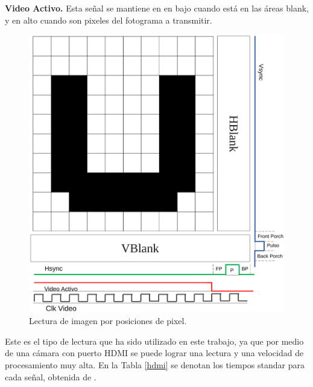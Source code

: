 \documentclass[twoside,spanish,ESP,MSc]{plantillaLabUPV}
\theoremstyle{definition}
\begin{document}
\begin{enumerate}
 \checkmark\textbf{Video Activo.} Esta señal se mantiene en en bajo cuando está en las áreas blank, y en alto cuando son pixeles del fotograma a transmitir.
 
 
 \begin{figure}[!tbh]
 	\centering
 	\includegraphics[scale=0.3]{edrawimas/scanU}
 	\caption{Lectura de imagen por posiciones de pixel. 
 		\label{scanU}}
 \end{figure}
 
\end{enumerate}

Este es el tipo de lectura que ha sido utilizado en este trabajo, ya que por medio de una cámara con puerto HDMI se puede lograr una lectura y una velocidad de procesamiento muy alta. En la Tabla \ref{hdmi} se denotan los tiempos standar para cada señal, obtenida de \cite{demisti}.
\end{document}

